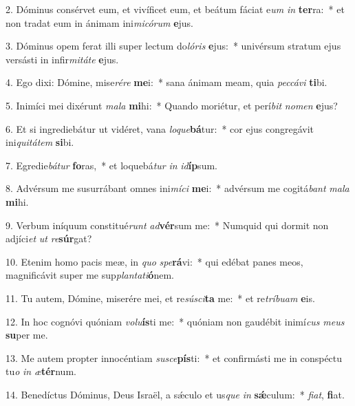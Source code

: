 2. Dóminus consérvet eum, et vivíficet eum, et beátum fáciat e\textit{um} \textit{in} \textbf{ter}ra:~*  et non tradat eum in ánimam ini\textit{mi}\textit{có}\textit{rum} \textbf{e}jus.\

3. Dóminus opem ferat illi super lectum do\textit{ló}\textit{ris} \textbf{e}jus:~*  univérsum stratum ejus versásti in infir\textit{mi}\textit{tá}\textit{te} \textbf{e}jus.\

4. Ego dixi: Dómine, mise\textit{ré}\textit{re} \textbf{me}i:~*  sana ánimam meam, quia \textit{pec}\textit{cá}\textit{vi} \textbf{ti}bi.\

5. Inimíci mei dixérunt \textit{ma}\textit{la} \textbf{mi}hi:~*  Quando moriétur, et perí\textit{bit} \textit{no}\textit{men} \textbf{e}jus?\

6. Et si ingrediebátur ut vidéret, vana \textit{lo}\textit{que}\textbf{bá}tur:~*  cor ejus congregávit ini\textit{qui}\textit{tá}\textit{tem} \textbf{si}bi.\

7. Egredie\textit{bá}\textit{tur} \textbf{fo}ras,~*  et loquebá\textit{tur} \textit{in} \textit{id}\textbf{íp}sum.\

8. Advérsum me susurrábant omnes ini\textit{mí}\textit{ci} \textbf{me}i:~*  advérsum me cogitá\textit{bant} \textit{ma}\textit{la} \textbf{mi}hi.\

9. Verbum iníquum constitué\textit{runt} \textit{ad}\textbf{vér}sum me:~*  Numquid qui dormit non adjíci\textit{et} \textit{ut} \textit{re}\textbf{súr}gat?\

10. Etenim homo pacis meæ, in \textit{quo} \textit{spe}\textbf{rá}vi:~*  qui edébat panes meos, magnificávit super me sup\textit{plan}\textit{ta}\textit{ti}\textbf{ó}nem.\

11. Tu autem, Dómine, miserére mei, et re\textit{sú}\textit{sci}\textbf{ta} me:~*  et re\textit{trí}\textit{bu}\textit{am} \textbf{e}is.\

12. In hoc cognóvi quóniam \textit{vo}\textit{lu}\textbf{ís}ti me:~*  quóniam non gaudébit inimí\textit{cus} \textit{me}\textit{us} \textbf{su}per me.\

13. Me autem propter innocéntiam \textit{su}\textit{sce}\textbf{pís}ti:~*  et confirmásti me in conspéctu tu\textit{o} \textit{in} \textit{æ}\textbf{tér}num.\

14. Benedíctus Dóminus, Deus Israël, a sǽculo et us\textit{que} \textit{in} \textbf{sǽ}culum:~*  \textit{fi}\textit{at}, \textbf{fi}at.\

